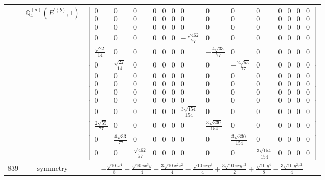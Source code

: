 \documentclass[fleqn,8pt,landscape]{jsarticle}
\begin{document}
\begin{longtable}{ccc}
$  $ & $ \mathbb{Q}_{4}^{(a)}(E^{\prime(b)},1) $ & $ \begin{bmatrix} 0 & 0 & 0 & 0 & 0 & 0 & 0 & 0 & 0 & 0 & 0 & 0 & 0 & 0 \\ 0 & 0 & 0 & 0 & 0 & 0 & 0 & 0 & 0 & 0 & 0 & 0 & 0 & 0 \\ 0 & 0 & 0 & 0 & 0 & 0 & 0 & 0 & 0 & 0 & 0 & 0 & 0 & 0 \\ 0 & 0 & 0 & 0 & 0 & 0 & - \frac{\sqrt{462}}{77} & 0 & 0 & 0 & 0 & 0 & 0 & 0 \\ \frac{\sqrt{22}}{14} & 0 & 0 & 0 & 0 & 0 & 0 & - \frac{4 \sqrt{33}}{77} & 0 & 0 & 0 & 0 & 0 & 0 \\ 0 & \frac{\sqrt{22}}{14} & 0 & 0 & 0 & 0 & 0 & 0 & - \frac{2 \sqrt{55}}{77} & 0 & 0 & 0 & 0 & 0 \\ 0 & 0 & 0 & 0 & 0 & 0 & 0 & 0 & 0 & 0 & 0 & 0 & 0 & 0 \\ 0 & 0 & 0 & 0 & 0 & 0 & 0 & 0 & 0 & 0 & 0 & 0 & 0 & 0 \\ 0 & 0 & 0 & 0 & 0 & 0 & 0 & 0 & 0 & 0 & 0 & 0 & 0 & 0 \\ 0 & 0 & 0 & 0 & 0 & 0 & 0 & 0 & 0 & 0 & 0 & 0 & 0 & 0 \\ 0 & 0 & 0 & 0 & 0 & 0 & \frac{3 \sqrt{154}}{154} & 0 & 0 & 0 & 0 & 0 & 0 & 0 \\ \frac{2 \sqrt{55}}{77} & 0 & 0 & 0 & 0 & 0 & 0 & \frac{3 \sqrt{330}}{154} & 0 & 0 & 0 & 0 & 0 & 0 \\ 0 & \frac{4 \sqrt{33}}{77} & 0 & 0 & 0 & 0 & 0 & 0 & \frac{3 \sqrt{330}}{154} & 0 & 0 & 0 & 0 & 0 \\ 0 & 0 & \frac{\sqrt{462}}{77} & 0 & 0 & 0 & 0 & 0 & 0 & \frac{3 \sqrt{154}}{154} & 0 & 0 & 0 & 0 \end{bmatrix} $ \\ \hline
$ 839 $ & $ \text{symmetry} $ & $ - \frac{\sqrt{10} x^{4}}{8} - \frac{\sqrt{10} i x^{3} y}{4} + \frac{3 \sqrt{10} x^{2} z^{2}}{4} - \frac{\sqrt{10} i x y^{3}}{4} + \frac{3 \sqrt{10} i x y z^{2}}{2} + \frac{\sqrt{10} y^{4}}{8} - \frac{3 \sqrt{10} y^{2} z^{2}}{4} $ \\

\end{longtable}
\end{document}

